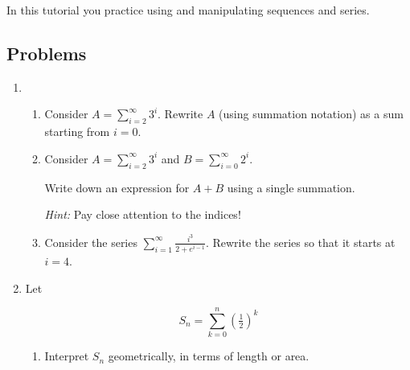		
\begin{objectives}
	In this tutorial you practice using and manipulating sequences and series.
\end{objectives}

	\vspace{-1em}
\subsection*{Problems}
\begin{enumerate}
	\item 
    
        \begin{enumerate}
			\item Consider $A=\displaystyle \sum_{i=2}^\infty 3^{i}$. Rewrite $A$ (using summation notation) as
			a sum starting from $i=0$.
            \item %
            Consider  $A=\displaystyle \sum_{i=2}^\infty 3^{i}$ and
             $
			 B=\displaystyle \sum_{i=0}^\infty 2^{i}$.

            Write down an expression for $A+B$ using a single summation.

			\emph{Hint:} Pay close attention to the indices!

            \item %
            Consider the series $\displaystyle \sum_{i=1}^\infty \frac{i^3}{2+e^{i-1}}$. Rewrite the series so that it starts at $i=4$.
            
            
        \end{enumerate}%
        
        \item %

        Let 
        
        \[S_n = \sum^n_{k=0} \left(\tfrac{1}{2}\right)^k\]

        \begin{enumerate}
            \item Interpret $S_n$ geometrically, in terms of length or area.


\end{enumerate}
\end{enumerate}
